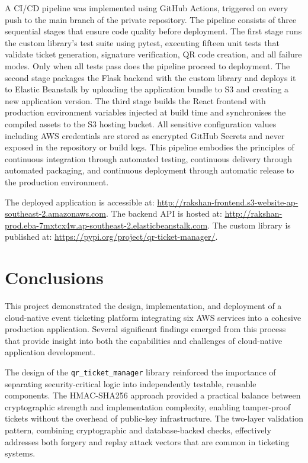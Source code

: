 \documentclass[conference]{IEEEtran}
\begin{document}
A CI/CD pipeline was implemented using GitHub Actions, triggered on every push to the main branch of the private repository. The pipeline consists of three sequential stages that ensure code quality before deployment. The first stage runs the custom library's test suite using pytest, executing fifteen unit tests that validate ticket generation, signature verification, QR code creation, and all failure modes. Only when all tests pass does the pipeline proceed to deployment. The second stage packages the Flask backend with the custom library and deploys it to Elastic Beanstalk by uploading the application bundle to S3 and creating a new application version. The third stage builds the React frontend with production environment variables injected at build time and synchronises the compiled assets to the S3 hosting bucket. All sensitive configuration values including AWS credentials are stored as encrypted GitHub Secrets and never exposed in the repository or build logs. This pipeline embodies the principles of continuous integration through automated testing, continuous delivery through automated packaging, and continuous deployment through automatic release to the production environment.

The deployed application is accessible at: \url{http://rakshan-frontend.s3-website-ap-southeast-2.amazonaws.com}. The backend API is hosted at: \url{http://rakshan-prod.eba-7mxtcx4w.ap-southeast-2.elasticbeanstalk.com}. The custom library is published at: \url{https://pypi.org/project/qr-ticket-manager/}.

\section{Conclusions}

This project demonstrated the design, implementation, and deployment of a cloud-native event ticketing platform integrating six AWS services into a cohesive production application. Several significant findings emerged from this process that provide insight into both the capabilities and challenges of cloud-native application development.

The design of the \texttt{qr\_ticket\_manager} library reinforced the importance of separating security-critical logic into independently testable, reusable components. The HMAC-SHA256 approach provided a practical balance between cryptographic strength and implementation complexity, enabling tamper-proof tickets without the overhead of public-key infrastructure. The two-layer validation pattern, combining cryptographic and database-backed checks, effectively addresses both forgery and replay attack vectors that are common in ticketing systems.
\end{document}
